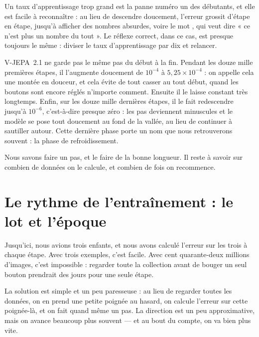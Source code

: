 \begin{piege}
Un taux d'apprentissage trop grand est la panne numéro un des débutants, et
elle est facile à reconnaître : au lieu de descendre doucement, l'erreur
grossit d'étape en étape, jusqu'à afficher des nombres absurdes, voire le
mot , qui veut dire « ce n'est plus un nombre du tout ».
Le réflexe correct, dans ce cas, est presque toujours le même : diviser le
taux d'apprentissage par dix et relancer.
\end{piege}

\begin{surlesdonnees}
V-JEPA~2.1 ne garde pas le même pas du début à la fin. Pendant les douze
mille premières étapes, il l'augmente doucement de $10^{-4}$ à
$5{,}25 \times 10^{-4}$ : on appelle cela une montée en douceur, et cela
évite de tout casser au tout début, quand les boutons sont encore réglés
n'importe comment. Ensuite il le laisse constant très longtemps. Enfin, sur les douze
mille dernières étapes, il le fait redescendre jusqu'à $10^{-6}$, c'est-à-dire
presque zéro : les pas deviennent minuscules et le modèle se pose tout
doucement au fond de la vallée, au lieu de continuer à sautiller autour.
Cette dernière phase porte un nom que nous retrouverons souvent : la phase
de refroidissement.
\end{surlesdonnees}

Nous savons faire un pas, et le faire de la bonne longueur. Il reste à
savoir sur combien de données on le calcule, et combien de fois on
recommence.

\section{Le rythme de l'entraînement : le lot et l'époque}

Jusqu'ici, nous avions trois enfants, et nous avons calculé l'erreur sur les
trois à chaque étape. Avec trois exemples, c'est facile. Avec cent
quarante-deux millions d'images, c'est impossible : regarder toute la
collection avant de bouger un seul bouton prendrait des jours pour une seule
étape.

\begin{enclair}
La solution est simple et un peu paresseuse : au lieu de regarder toutes les
données, on en prend une petite poignée au hasard, on calcule l'erreur sur
cette poignée-là, et on fait quand même un pas. La direction est un peu
approximative, mais on avance beaucoup plus souvent — et au bout du compte,
on va bien plus vite.
\end{enclair}

